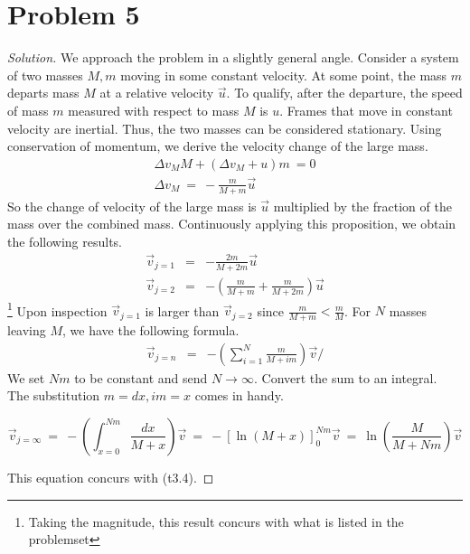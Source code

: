 \documentclass{article}
\numberwithin{equation}{section}
\begin{document}
\section{Problem 5}
\begin{proof}[Solution]
    We approach the problem in a slightly general angle. Consider 
    a system of two masses $M, m$ moving in some constant velocity. 
    At some point, the mass $m$ departs mass $M$ at a relative velocity $\vec u$. 
    To qualify, after the departure, the speed of mass $m$ measured with 
    respect to mass $M$ is $u$. 
    Frames that move in constant velocity are inertial. Thus, the 
    two masses can be considered stationary. Using conservation of momentum, 
    we derive the velocity change of the large mass. 
    \begin{eqnarray}
        \Delta v_M M + (\Delta v_M + u) m \ = 0 \nonumber \\ 
        \Delta v_M \ = \  -\frac m {M + m} \vec u 
    \end{eqnarray}
    So the change of velocity of the large mass is $\vec u$ multiplied 
    by the fraction of the mass over the combined mass. Continuously applying this 
    proposition, we obtain the following results. 
    \begin{eqnarray}
    \vec v_{j = 1}  & =  & -\frac {2m} {M + 2m} \vec u \\ 
    \vec v_{j = 2} & = & -\left(
        \frac m {M + m} + \frac m {M + 2m}
    \right)\vec u 
\end{eqnarray}\footnote{Taking the magnitude, this result concurs with what is listed in the problemset}
Upon inspection $\vec v_{j = 1}$ is larger than $\vec v_{j = 2}$ since 
$\frac m {M + m} < \frac m M$. 
For $N$ masses leaving $M$, we have the following formula. 
\begin{eqnarray}
    \vec v_{j = n} & = & -\left(\sum_{i = 1}^N \frac m{M + im} \right) \vec v/
\end{eqnarray}
We set $Nm$ to be constant and send $N \rightarrow \infty$. Convert 
the sum to an integral. The substitution $m = dx, im = x$ comes in handy. 

\begin{equation}
    \vec v_{j=\infty} \ = \ 
     -\left(\int_{x = 0}^{Nm} \frac {dx}{M + x} \right) \vec v \ = \ 
     -\left[
        \ln(M + x)
     \right]_0^{Nm}\vec v \ = \ \ln\left(
        \frac {M} {M + Nm}
     \right)\vec v
\end{equation}

This equation concurs with (t3.4). 

\end{proof}
\end{document}
